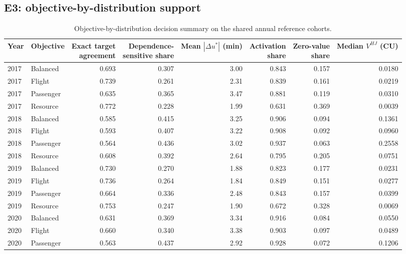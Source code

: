\documentclass[10pt,a4paper]{article}
\numberwithin{equation}{section}
\begin{document}
\subsection{E3: objective-by-distribution support}
\begin{table}[htbp]\centering\footnotesize
\caption{Objective-by-distribution decision summary on the shared annual reference cohorts.}\label{tab:sup_e3}
\begin{tabular}{llrrrrrr}\toprule
Year & Objective & \shortstack{Exact target\\agreement} & \shortstack{Dependence-\\sensitive share} & \shortstack{Mean $|\Delta u^*|$\\(min)} & \shortstack{Activation\\share} & \shortstack{Zero-value\\share} & \shortstack{Median $V^{HJ}$\\(CU)} \\ \midrule
2017 & Balanced & 0.693 & 0.307 & 3.00 & 0.843 & 0.157 & 0.0180 \\
2017 & Flight & 0.739 & 0.261 & 2.31 & 0.839 & 0.161 & 0.0219 \\
2017 & Passenger & 0.635 & 0.365 & 3.47 & 0.881 & 0.119 & 0.0310 \\
2017 & Resource & 0.772 & 0.228 & 1.99 & 0.631 & 0.369 & 0.0039 \\
2018 & Balanced & 0.585 & 0.415 & 3.25 & 0.906 & 0.094 & 0.1361 \\
2018 & Flight & 0.593 & 0.407 & 3.22 & 0.908 & 0.092 & 0.0960 \\
2018 & Passenger & 0.564 & 0.436 & 3.02 & 0.937 & 0.063 & 0.2558 \\
2018 & Resource & 0.608 & 0.392 & 2.64 & 0.795 & 0.205 & 0.0751 \\
2019 & Balanced & 0.730 & 0.270 & 1.88 & 0.823 & 0.177 & 0.0231 \\
2019 & Flight & 0.736 & 0.264 & 1.84 & 0.849 & 0.151 & 0.0277 \\
2019 & Passenger & 0.664 & 0.336 & 2.48 & 0.843 & 0.157 & 0.0399 \\
2019 & Resource & 0.753 & 0.247 & 1.90 & 0.672 & 0.328 & 0.0069 \\
2020 & Balanced & 0.631 & 0.369 & 3.34 & 0.916 & 0.084 & 0.0550 \\
2020 & Flight & 0.660 & 0.340 & 3.38 & 0.903 & 0.097 & 0.0489 \\
2020 & Passenger & 0.563 & 0.437 & 2.92 & 0.928 & 0.072 & 0.1206 \\

\end{tabular}
\end{table}
\end{document}
